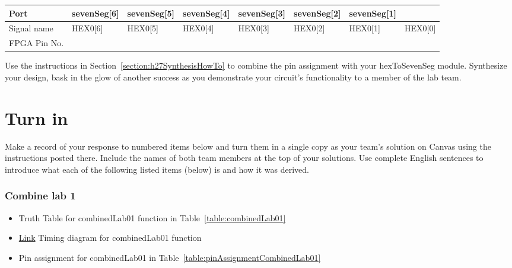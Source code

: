 \begin{longtable}[]{@{}
        | >{\raggedright\arraybackslash}p{}|
        >{\raggedright\arraybackslash}p{}|
        >{\raggedright\arraybackslash}p{}|
        >{\raggedright\arraybackslash}p{}|
        >{\raggedright\arraybackslash}p{}|
        >{\raggedright\arraybackslash}p{}|
        >{\raggedright\arraybackslash}p{}|
    >{\raggedright\arraybackslash}p{}|@{}}
    \toprule()
    Port &
    sevenSeg{[}6{]} &
    sevenSeg{[}5{]} &
    sevenSeg{[}4{]} &
    sevenSeg{[}3{]} &
    sevenSeg{[}2{]} &
    sevenSeg{[}1{]} \\ \hline
    \midrule()
    \endhead
    Signal name & HEX0{[}6{]} & HEX0{[}5{]} & HEX0{[}4{]} & HEX0{[}3{]} &
    HEX0{[}2{]} & HEX0{[}1{]} & HEX0{[}0{]} \\ \hline
    FPGA Pin No. & & & & & & & \\ \hline
    \bottomrule()

\end{longtable}
Use the instructions in Section~\ref{section:h27SynthesisHowTo} to
combine the pin assignment with your hexToSevenSeg module.
Synthesize your design, bask in the glow of another success as you
demonstrate your circuit's functionality to a member of the lab team.

\section{Turn in}

Make a record of your response to numbered items below and turn them in
a single copy as your team's solution on Canvas using the instructions
posted there. Include the names of both team members at the top of your
solutions. Use complete English sentences to introduce what each of the
following listed items (below) is and how it was derived.

\subsubsection{Combine lab 1}
\begin{itemize}
    \item Truth Table for combinedLab01 function in Table~\ref{table:combinedLab01}
    \item \protect\hyperlink{CombinedLab01_Waveform}{Link} Timing diagram for combinedLab01 function
    \item  Pin assignment for combinedLab01 in Table~\ref{table:pinAssignmentCombinedLab01}
\end{itemize}

